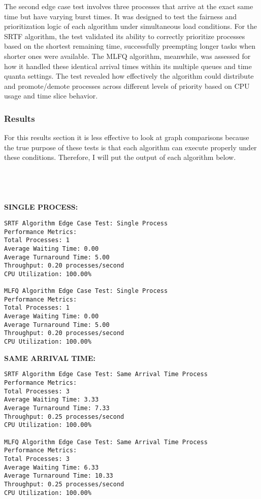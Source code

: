 \documentclass[11pt]{article}
\begin{document}
The second edge case test involves three processes that arrive at the exact same time but have varying burst times. It was designed to test the fairness and prioritization logic of each algorithm under simultaneous load conditions. For the SRTF algorithm, the test validated its ability to correctly prioritize processes based on the shortest remaining time, successfully preempting longer tasks when shorter ones were available. The MLFQ algorithm, meanwhile, was assessed for how it handled these identical arrival times within its multiple queues and time quanta settings. The test revealed how effectively the algorithm could distribute and promote/demote processes across different levels of priority based on CPU usage and time slice behavior.

\subsubsection{Results}

For this results section it is less effective to look at graph comparisons because the true purpose of these tests is that each algorithm can execute properly under these conditions. Therefore, I will put the output of each algorithm below.
\\
\\
\\
\\
\\
\textbf{SINGLE PROCESS:}
\begin{verbatim}
SRTF Algorithm Edge Case Test: Single Process
Performance Metrics:
Total Processes: 1
Average Waiting Time: 0.00
Average Turnaround Time: 5.00
Throughput: 0.20 processes/second
CPU Utilization: 100.00%

MLFQ Algorithm Edge Case Test: Single Process
Performance Metrics:
Total Processes: 1
Average Waiting Time: 0.00
Average Turnaround Time: 5.00
Throughput: 0.20 processes/second
CPU Utilization: 100.00%
\end{verbatim}
\textbf{SAME ARRIVAL TIME:}
\begin{verbatim}
SRTF Algorithm Edge Case Test: Same Arrival Time Process
Performance Metrics:
Total Processes: 3
Average Waiting Time: 3.33
Average Turnaround Time: 7.33
Throughput: 0.25 processes/second
CPU Utilization: 100.00%

MLFQ Algorithm Edge Case Test: Same Arrival Time Process
Performance Metrics:
Total Processes: 3
Average Waiting Time: 6.33
Average Turnaround Time: 10.33
Throughput: 0.25 processes/second
CPU Utilization: 100.00%
\end{verbatim}
\end{document}
